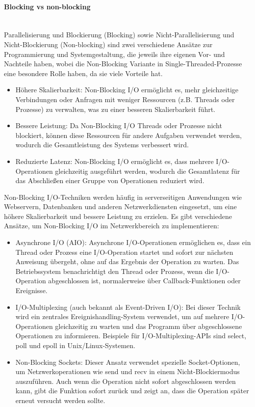 \documentclass[../vs-script-first-v01.tex]{subfiles}
\begin{document}
\paragraph{Blocking vs non-blocking\\\\}
Parallelisierung und Blockierung (Blocking) sowie Nicht-Parallelisierung und Nicht-Blockierung (Non-blocking) sind zwei verschiedene Ansätze zur Programmierung und Systemgestaltung, die jeweils ihre eigenen Vor- und Nachteile haben, wobei die Non-Blocking Variante in Single-Threaded-Prozesse eine besondere Rolle haben, da sie viele Vorteile hat. 
\begin{itemize}
\item Höhere Skalierbarkeit: Non-Blocking I/O ermöglicht es, mehr gleichzeitige Verbindungen oder Anfragen mit weniger Ressourcen (z.B. Threads oder Prozesse) zu verwalten, was zu einer besseren Skalierbarkeit führt.
\item Bessere Leistung: Da Non-Blocking I/O Threads oder Prozesse nicht blockiert, können diese Ressourcen für andere Aufgaben verwendet werden, wodurch die Gesamtleistung des Systems verbessert wird.
\item Reduzierte Latenz: Non-Blocking I/O ermöglicht es, dass mehrere I/O-Operationen gleichzeitig ausgeführt werden, wodurch die Gesamtlatenz für das Abschließen einer Gruppe von Operationen reduziert wird.
\end{itemize}
Non-Blocking I/O-Techniken werden häufig in serverseitigen Anwendungen wie Webservern, Datenbanken und anderen Netzwerkdiensten eingesetzt, um eine höhere Skalierbarkeit und bessere Leistung zu erzielen. Es gibt verschiedene Ansätze, um Non-Blocking I/O im Netzwerkbereich zu implementieren:
\begin{itemize}
\item Asynchrone I/O (AIO): Asynchrone I/O-Operationen ermöglichen es, dass ein Thread oder Prozess eine I/O-Operation startet und sofort zur nächsten Anweisung übergeht, ohne auf das Ergebnis der Operation zu warten. Das Betriebssystem benachrichtigt den Thread oder Prozess, wenn die I/O-Operation abgeschlossen ist, normalerweise über Callback-Funktionen oder Ereignisse.
\item I/O-Multiplexing (auch bekannt als Event-Driven I/O): Bei dieser Technik wird ein zentrales Ereignishandling-System verwendet, um auf mehrere I/O-Operationen gleichzeitig zu warten und das Programm über abgeschlossene Operationen zu informieren. Beispiele für I/O-Multiplexing-APIs sind select, poll und epoll in Unix/Linux-Systemen.
\item Non-Blocking Sockets: Dieser Ansatz verwendet spezielle Socket-Optionen, um Netzwerkoperationen wie send und recv in einem Nicht-Blockiermodus auszuführen. Auch wenn die Operation nicht sofort abgeschlossen werden kann, gibt die Funktion sofort zurück und zeigt an, dass die Operation später erneut versucht werden sollte.
\end{itemize}
\end{document}
